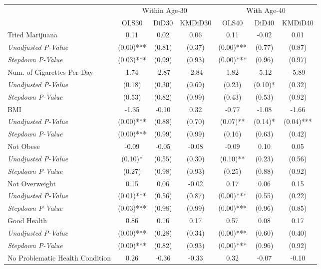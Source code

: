 \begin{tabular}{l c c c c c c}
\toprule
& \multicolumn{3}{c}{Within Age-30} & \multicolumn{3}{c}{With Age-40} \\\cmidrule(lr){2-4} \cmidrule(lr){5-7}
 & OLS30 & DiD30 & KMDiD30 & OLS40 & DiD40 & KMDiD40 \\
\midrule
Tried Marijuana & 0.11 & 0.02 & 0.06 & 0.11 & -0.02 & 0.01 \\
\quad \textit{Unadjusted P-Value} & (0.00)*** & (0.81) & (0.37) & (0.00)*** & (0.77) & (0.87) \\
\quad \textit{Stepdown P-Value} & (0.03)*** & (0.99) & (0.93) & (0.00)*** & (0.96) & (0.97) \\
Num. of Cigarettes Per Day & 1.74 & -2.87 & -2.84 & 1.82 & -5.12 & -5.89 \\
\quad \textit{Unadjusted P-Value} & (0.18) & (0.30) & (0.69) & (0.23) & (0.10)* & (0.32) \\
\quad \textit{Stepdown P-Value} & (0.53) & (0.82) & (0.99) & (0.43) & (0.53) & (0.92) \\
BMI & -1.35 & -0.10 & 0.32 & -0.77 & -1.08 & -1.66 \\
\quad \textit{Unadjusted P-Value} & (0.00)*** & (0.88) & (0.70) & (0.07)** & (0.14)* & (0.04)*** \\
\quad \textit{Stepdown P-Value} & (0.00)*** & (0.99) & (0.99) & (0.16) & (0.63) & (0.42) \\
Not Obese & -0.09 & -0.05 & -0.08 & -0.09 & 0.10 & 0.05 \\
\quad \textit{Unadjusted P-Value} & (0.10)* & (0.55) & (0.30) & (0.10)** & (0.23) & (0.56) \\
\quad \textit{Stepdown P-Value} & (0.27) & (0.98) & (0.93) & (0.25) & (0.88) & (0.92) \\
Not Overweight & 0.15 & 0.06 & -0.02 & 0.17 & 0.06 & 0.15 \\
\quad \textit{Unadjusted P-Value} & (0.01)*** & (0.56) & (0.87) & (0.00)*** & (0.55) & (0.22) \\
\quad \textit{Stepdown P-Value} & (0.03)*** & (0.98) & (0.99) & (0.00)*** & (0.96) & (0.85) \\
Good Health & 0.86 & 0.16 & 0.17 & 0.57 & 0.08 & 0.17 \\
\quad \textit{Unadjusted P-Value} & (0.00)*** & (0.28) & (0.34) & (0.00)*** & (0.60) & (0.40) \\
\quad \textit{Stepdown P-Value} & (0.00)*** & (0.82) & (0.93) & (0.00)*** & (0.96) & (0.92) \\
No Problematic Health Condition & 0.26 & -0.36 & -0.33 & 0.32 & -0.07 & -0.10 \\

\end{tabular}
